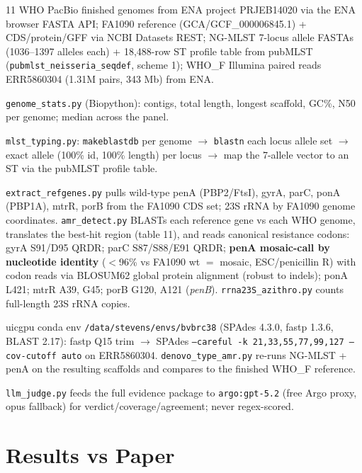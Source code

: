 \documentclass[11pt,letterpaper]{article}
\begin{document}
\begin{description}[leftmargin=1.5em]
  \item[Data acquisition.] 11 WHO PacBio finished genomes from ENA project PRJEB14020 via the ENA browser FASTA API; FA1090 reference (GCA/GCF\_000006845.1) + CDS/protein/GFF via NCBI Datasets REST; NG-MLST 7-locus allele FASTAs (1036--1397 alleles each) + 18{,}488-row ST profile table from pubMLST (\texttt{pubmlst\_neisseria\_seqdef}, scheme 1); WHO\_F Illumina paired reads ERR5860304 (1.31M pairs, 343 Mb) from ENA.
  \item[Genome statistics (C1a).] \texttt{genome\_stats.py} (Biopython): contigs, total length, longest scaffold, GC\%, N50 per genome; median across the panel.
  \item[NG-MLST typing (C2).] \texttt{mlst\_typing.py}: \texttt{makeblastdb} per genome $\rightarrow$ \texttt{blastn} each locus allele set $\rightarrow$ exact allele (100\% id, 100\% length) per locus $\rightarrow$ map the 7-allele vector to an ST via the pubMLST profile table.
  \item[NG-STAR AMR-determinant detection (C3).] \texttt{extract\_refgenes.py} pulls wild-type penA (PBP2/FtsI), gyrA, parC, ponA (PBP1A), mtrR, porB from the FA1090 CDS set; 23S rRNA by FA1090 genome coordinates. \texttt{amr\_detect.py} BLASTs each reference gene vs each WHO genome, translates the best-hit region (table 11), and reads canonical resistance codons: gyrA S91/D95 QRDR; parC S87/S88/E91 QRDR; \textbf{penA mosaic-call by nucleotide identity} ($<$96\% vs FA1090 wt $=$ mosaic, ESC/penicillin R) with codon reads via BLOSUM62 global protein alignment (robust to indels); ponA L421; mtrR A39, G45; porB G120, A121 (\textit{penB}). \texttt{rrna23S\_azithro.py} counts full-length 23S rRNA copies.
  \item[End-to-end de-novo assembly (C1 + C4).] uicgpu conda env \texttt{/data/stevens/envs/bvbrc38} (SPAdes 4.3.0, fastp 1.3.6, BLAST 2.17): fastp Q15 trim $\rightarrow$ SPAdes \texttt{--careful -k 21,33,55,77,99,127 --cov-cutoff auto} on ERR5860304. \texttt{denovo\_type\_amr.py} re-runs NG-MLST + penA on the resulting scaffolds and compares to the finished WHO\_F reference.
  \item[LLM-judge scoring.] \texttt{llm\_judge.py} feeds the full evidence package to \texttt{argo:gpt-5.2} (free Argo proxy, opus fallback) for verdict/coverage/agreement; never regex-scored.
\end{description}

\section{Results vs Paper}
\end{document}
